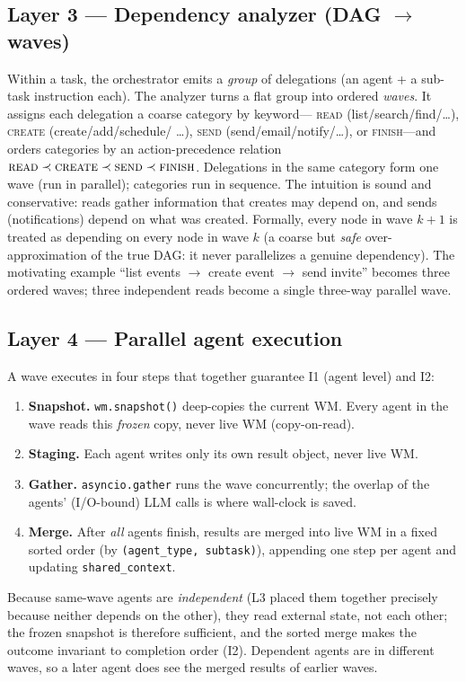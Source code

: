\documentclass[10pt,twocolumn]{article}
\newcommand{\code}[1]{\texttt{\small #1}}
\begin{document}
\subsection{Layer 3 --- Dependency analyzer (DAG $\to$ waves)}
Within a task, the orchestrator emits a \emph{group} of delegations
(an agent + a sub-task instruction each). The analyzer turns a flat group into
ordered \emph{waves}. It assigns each delegation a coarse category by keyword---
\textsc{read} (list/search/find/\ldots), \textsc{create} (create/add/schedule/
\ldots), \textsc{send} (send/email/notify/\ldots), or \textsc{finish}---and
orders categories by an action-precedence relation
$\textsc{read}\prec\textsc{create}\prec\textsc{send}\prec\textsc{finish}$.
Delegations in the same category form one wave (run in parallel); categories run
in sequence. The intuition is sound and conservative: reads gather information
that creates may depend on, and sends (notifications) depend on what was
created. Formally, every node in wave $k{+}1$ is treated as depending on every
node in wave $k$ (a coarse but \emph{safe} over-approximation of the true DAG:
it never parallelizes a genuine dependency). The motivating example
``list events $\to$ create event $\to$ send invite'' becomes three ordered
waves; three independent reads become a single three-way parallel wave.

\subsection{Layer 4 --- Parallel agent execution}
A wave executes in four steps that together guarantee \textsc{I1} (agent level)
and \textsc{I2}:
\begin{enumerate}\itemsep0pt
\item \textbf{Snapshot.} \code{wm.snapshot()} deep-copies the current WM. Every
agent in the wave reads this \emph{frozen} copy, never live WM (copy-on-read).
\item \textbf{Staging.} Each agent writes only its own result object, never live
WM.
\item \textbf{Gather.} \code{asyncio.gather} runs the wave concurrently; the
overlap of the agents' (I/O-bound) LLM calls is where wall-clock is saved.
\item \textbf{Merge.} After \emph{all} agents finish, results are merged into
live WM in a fixed sorted order (by \code{(agent\_type, sub\-task)}), appending
one step per agent and updating \code{shared\_context}.
\end{enumerate}
Because same-wave agents are \emph{independent} (L3 placed them together
precisely because neither depends on the other), they read external state, not
each other; the frozen snapshot is therefore sufficient, and the sorted merge
makes the outcome invariant to completion order (\textsc{I2}). Dependent agents
are in different waves, so a later agent does see the merged results of earlier
waves.
\end{document}
